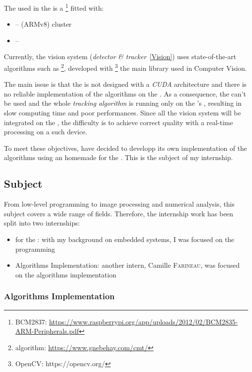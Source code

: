 The  used in the \rasp{} is a  \bcm{}\footnote{BCM2837: \url{https://www.raspberrypi.org/app/uploads/2012/02/BCM2835-ARM-Peripherals.pdf}} fitted with:
\begin{itemize}
\item {} --  (ARMv8) cluster
\item {} -- \vc{}
\end{itemize}

Currently, the vision system (\emph{detector \& tracker}~\ref{Vision}) uses state-of-the-art algorithms such as \footnote{ algorithm: \url{https://www.gnebehay.com/cmt/}}, developed with \footnote{OpenCV: https://opencv.org/} the main library used in Computer Vision.

The main issue is that the \bcm{} is not designed with a \emph{CUDA} architecture and there is no reliable implementation of the algorithms on the \rasp. As a consequence, the \vc{} can't be used and the whole \emph{tracking algorithm} is running only on the \rasp's , resulting in slow computing time and poor performances. Since all the vision system will be integrated on the \rasp, the difficulty is to achieve correct quality with a real-time processing on a such device.

To meet these objectives, \groupname{} have decided to developp its own implementation of the algorithms using an homemade  for the \vc. This is the subject of my internship.


\subsection{Subject}

From low-level programming to image processing and numerical analysis, this subject covers a wide range of fields. Therefore, the internship work has been split into two internships:

\begin{itemize}
\item {} for the : with my background on embedded systems, I was focused on the \vc{} programming
\item Algorithms Implementation: another intern, Camille \textsc{Farineau}, was focused on the  algorithms implementation
\end{itemize}


\subsubsection{Algorithms Implementation}

